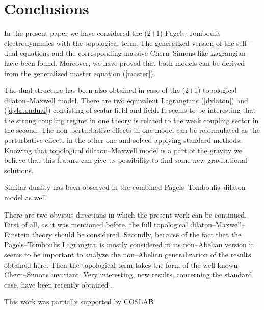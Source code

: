 \documentclass[a4 paper, 12 pt] {article}
\begin{document}
\section{\bf{Conclusions}}
In the present paper we have considered the (2+1) Pagels--Tomboulis
electrodynamics with the topological term. The generalized version
of the self--dual equations and the corresponding massive
Chern--Simons-like Lagrangian have been found. Moreover, we have
proved that both models can be derived from the generalized master
equation (\ref{master}).
\par
The dual structure has been also obtained in case of the (2+1)
topological dilaton--Maxwell model. There are two equivalent
Lagrangians (\ref{dylaton}) and (\ref{dylatondual}) consisting of
scalar field and \coordHE{} field. It seems to be interesting that the
strong coupling regime in one theory is related to the weak
coupling sector in the second. The non--perturbative effects in one
model can be reformulated as the perturbative effects in the other
one and solved applying standard methods. Knowing that \coordHE{}
topological dilaton--Maxwell model is a part of the \coordHE{} gravity
we believe that this feature can give us possibility to find some
new gravitational solutions.
\par
Similar duality has been observed in the combined
Pagels--Tomboulis--dilaton model as well.
\par
There are two obvious directions in which the present work can be
continued. First of all, as it was mentioned before, the full
\coordHE{} topological dilaton--Maxwell--Einstein theory should be
considered. Secondly, because of the fact that the
Pagels--Tomboulis Lagrangian is mostly considered in its
non--Abelian version it seems to be important to analyze the
non--Abelian generalization of the results obtained here. Then the
topological term takes the form of the well-known \coordHE{}
Chern--Simons invariant. Very interesting, new results, concerning
the standard \coordHE{} case, have been recently obtained
\cite{wotzasek}.
\newline
\par
This work was partially supported by COSLAB.
\end{document}
